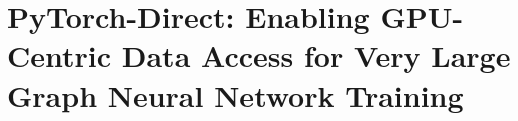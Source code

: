 \chapter{PyTorch-Direct: Enabling GPU-Centric Data Access for Very Large Graph Neural Network Training}
\label{ch:pytorch_direct}






